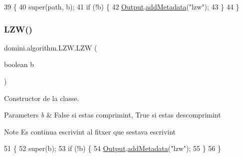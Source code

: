 \begin{DoxyCode}
39                                        \{
40         super(path, b);
41         \textcolor{keywordflow}{if} (!b) \{
42             \hyperlink{classdomini_1_1algorithm_1_1Algorithm_a4de9955411c656325adc391ef570c082}{Output}.\hyperlink{classpersistencia_1_1output_1_1Ctrl__Output_ae6d6857910a023982900ddc857b891f0}{addMetadata}(\textcolor{stringliteral}{"lzw"});
43         \}
44     \}
\end{DoxyCode}
\mbox{\label{classdomini_1_1algorithm_1_1LZW_ad8feac199454cb47321930e6d737360e}} 
\subsubsection{\texorpdfstring{L\+Z\+W()}{LZW()}\hspace{0.1cm}{\footnotesize\ttfamily [2/2]}}
{\footnotesize\ttfamily domini.\+algorithm.\+L\+Z\+W.\+L\+ZW (\begin{DoxyParamCaption}\item[{boolean}]{b }\end{DoxyParamCaption})\hspace{0.3cm}{\ttfamily [inline]}}



Constructor de la classe. 


\begin{DoxyParams}{Parameters}
{\em b} & False si estas comprimint, True si estas descomprimint \\
\hline
\end{DoxyParams}
\begin{DoxyNote}{Note}
Es continua escrivint al fitxer que s\textquotesingle{}estava escrivint 
\end{DoxyNote}

\begin{DoxyCode}
51                           \{
52         super(b);
53         \textcolor{keywordflow}{if} (!b) \{
54             \hyperlink{classdomini_1_1algorithm_1_1Algorithm_a4de9955411c656325adc391ef570c082}{Output}.\hyperlink{classpersistencia_1_1output_1_1Ctrl__Output_ae6d6857910a023982900ddc857b891f0}{addMetadata}(\textcolor{stringliteral}{"lzw"});
55         \}
56     \}
\end{DoxyCode}


